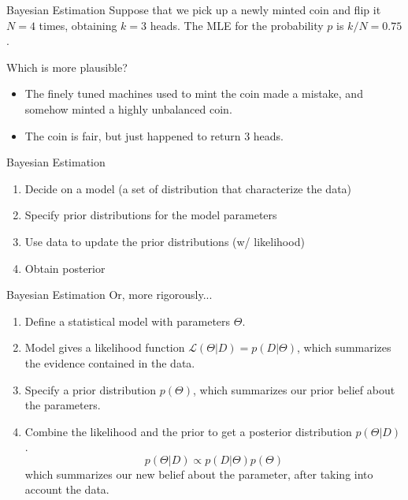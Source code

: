 \documentclass{beamer}
\begin{document}
\begin{frame}{Bayesian Estimation}
Suppose that we pick up a newly minted coin and flip it $N=4$ times, obtaining $k=3$ heads.
The MLE for the probability $p$ is $k/N = 0.75$.\par
Which is more plausible?
    \begin{itemize}
        \item The finely tuned machines used to mint the coin made a mistake, and somehow minted a  highly unbalanced coin.
        \item The coin is fair, but just happened to return 3 heads.
    \end{itemize}
\end{frame}

\begin{frame}{Bayesian Estimation}
    \begin{enumerate}
        \item Decide on a model (a set of distribution that characterize the data)
        \item Specify prior distributions for the model parameters
        \item Use data to update the prior distributions (w/ likelihood)
        \item Obtain posterior
    \end{enumerate}
\end{frame}

\begin{frame}{Bayesian Estimation}
Or, more rigorously...
    \begin{enumerate}
        \item Define a statistical model with parameters $\Theta$.
        \item Model gives a likelihood function $\mathcal{L}(\Theta|D) = p(D|\Theta)$, which     
              summarizes the evidence contained in the data.
        \item Specify a prior distribution $p(\Theta)$, which summarizes our prior belief
              about the parameters.
        \item Combine the likelihood and the prior to get a posterior distribution
              $p(\Theta|D)$.
              \[ p(\Theta|D) \propto p(D|\Theta)p(\Theta) \]
              which summarizes our new belief about the parameter, after taking into account
              the data.
    \end{enumerate}
\end{frame}
\end{document}
